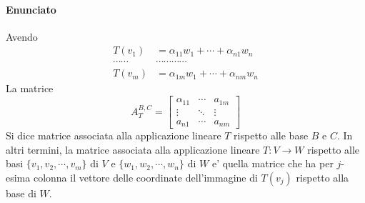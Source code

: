 \documentclass[a4paper, 10pt]{article}
\begin{document}
	\paragraph*{Enunciato}Avendo 
	\begin{equation*}
		\begin{split}
			T(v_1) &= \alpha_{11}w_1 + \cdots + \alpha_{n1} w_n \\
			\cdots \cdots & \cdots \cdots  \cdots \cdots \\
			T(v_m) &= \alpha_{1m} w_1 + \cdots + \alpha_{nm} w_n 
		\end{split}
	\end{equation*}
	La matrice 
	\[
		A_T ^{B,C} = \begin{bmatrix}
			\alpha_{11} & \cdots & a_{1m} \\
			\vdots	& \ddots & \vdots \\
			a_{n1} & \cdots & a_{nm}	
		\end{bmatrix}
	\]
	Si dice matrice associata alla applicazione lineare $T$ rispetto alle base $B$ e $C$. In altri termini, la matrice
	associata alla applicazione lineare $T : V \rightarrow W$ rispetto alle basi $ \lbrace v_1 , v_2, \cdots, v_m \rbrace$ 
	di $V$ e $\lbrace w_1, w_2, \cdots, w_n \rbrace$ di $W$ e' quella matrice che ha per $j$-esima colonna il vettore delle
	coordinate dell'immagine di $T(v_j)$ rispetto alla base di $W$.
\end{document}
